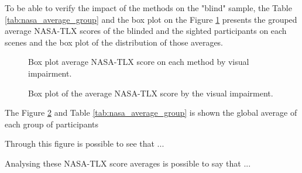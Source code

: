 To be able to verify the impact of the methods on the "blind" sample, the Table \ref{tab:nasa_average_group} and the box plot on the Figure \ref{fig:boxplot_nasa_scene} presents the grouped average NASA-TLX scores of the blinded and the sighted participants on each scenes and the box plot of the distribution of those averages.




\begin{figure}[!htb]
    \centering
    \resizebox{0.8\linewidth}{!}{
        
    }
    \caption{Box plot average NASA-TLX score on each method by visual impairment.}
    \label{fig:boxplot_nasa_scene}
\end{figure}

\begin{figure}[!htb]
    \centering
    \resizebox{0.8\linewidth}{!}{
        
    }
    \caption{Box plot of the average NASA-TLX score by the visual impairment.}
    \label{fig:boxplot_nasa}
\end{figure}

The Figure \ref{fig:boxplot_nasa} and Table \ref{tab:nasa_average_group} is shown the global average of each group of participants

Through this figure is possible to see that ... 

Analysing these NASA-TLX score averages is possible to say that ...

\FloatBarrier